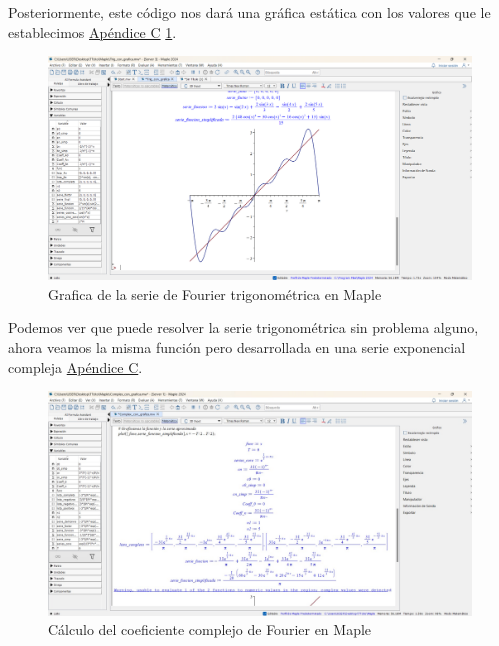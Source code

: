 Posteriormente, este código nos dará una gráfica estática con los valores que le establecimos \hyperref[app3:trig-code-maple]{Apéndice C} \ref{fig:maple-trig-series-graph}. 
\begin{figure}[H]
	\centering
	\includegraphics[width=1\textwidth]{img/chapter02/maple-trig-graph.png}
	\caption{Grafica de la serie de Fourier trigonométrica en Maple}
	\label{fig:maple-trig-series-graph}  %
\end{figure}
Podemos ver que puede resolver la serie trigonométrica sin problema alguno, ahora veamos la misma función pero desarrollada en una serie exponencial compleja  \hyperref[app3:complex-code-maple]{Apéndice C}.
\begin{figure}[H]
	\centering
	\includegraphics[width=1\textwidth]{img/chapter02/maple-complex-series-coeff.jpeg}
	\caption{Cálculo del coeficiente complejo de Fourier en Maple}
	\label{fig:maple-complex-series}  %
\end{figure}

